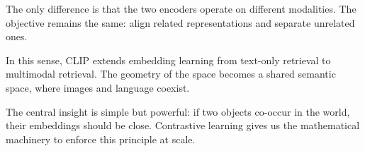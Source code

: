 The only difference is that the two encoders operate on different modalities. The objective remains the same: align related representations and separate unrelated ones.

In this sense, CLIP extends embedding learning from text-only retrieval to multimodal retrieval. The geometry of the space becomes a shared semantic space, where images and language coexist.

The central insight is simple but powerful: if two objects co-occur in the world, their embeddings should be close. Contrastive learning gives us the mathematical machinery to enforce this principle at scale.


\bigskip


